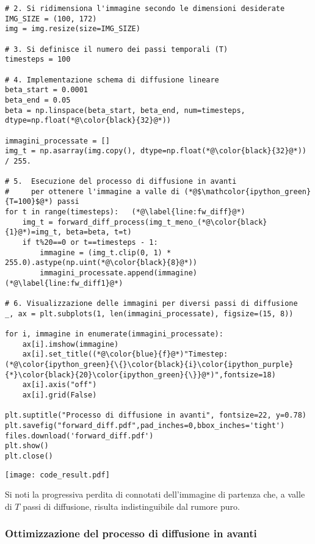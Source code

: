 \begin{lstlisting}[language=iPython, caption=Codice adattato da~\cite{nain2022} e implementato con Google Colab~\cite{GoogleColaboratory},label=lst:diff]
# 2. Si ridimensiona l'immagine secondo le dimensioni desiderate
IMG_SIZE = (100, 172)
img = img.resize(size=IMG_SIZE)

# 3. Si definisce il numero dei passi temporali (T)
timesteps = 100

# 4. Implementazione schema di diffusione lineare
beta_start = 0.0001
beta_end = 0.05
beta = np.linspace(beta_start, beta_end, num=timesteps, dtype=np.float(*@\color{black}{32}@*))

immagini_processate = [] 
img_t = np.asarray(img.copy(), dtype=np.float(*@\color{black}{32}@*)) / 255.

# 5.  Esecuzione del processo di diffusione in avanti
#     per ottenere l'immagine a valle di (*@$\mathcolor{ipython_green}{T=100}$@*) passi
for t in range(timesteps):   (*@\label{line:fw_diff}@*)                                                                
    img_t = forward_diff_process(img_t_meno_(*@\color{black}{1}@*)=img_t, beta=beta, t=t)
    if t%20==0 or t==timesteps - 1:   
        immagine = (img_t.clip(0, 1) * 255.0).astype(np.uint(*@\color{black}{8}@*))
        immagini_processate.append(immagine) (*@\label{line:fw_diff1}@*)

# 6. Visualizzazione delle immagini per diversi passi di diffusione
_, ax = plt.subplots(1, len(immagini_processate), figsize=(15, 8))

for i, immagine in enumerate(immagini_processate):
    ax[i].imshow(immagine)
    ax[i].set_title((*@\color{blue}{f}@*)"Timestep: (*@\color{ipython_green}{\{}\color{black}{i}\color{ipython_purple}{*}\color{black}{20}\color{ipython_green}{\}}@*)",fontsize=18)
    ax[i].axis("off")
    ax[i].grid(False)

plt.suptitle("Processo di diffusione in avanti", fontsize=22, y=0.78)
plt.savefig("forward_diff.pdf",pad_inches=0,bbox_inches='tight')
files.download('forward_diff.pdf')
plt.show()
plt.close()
\end{lstlisting}
\smallskip
\begin{center}
\texttt{[image: code\_result.pdf]}
\end{center}

\noindent Si noti la progressiva perdita di connotati dell'immagine di partenza che, a valle di 
$T$ passi di diffusione, risulta indistinguibile dal rumore puro. 



\subsubsection{Ottimizzazione del processo di diffusione in avanti}


